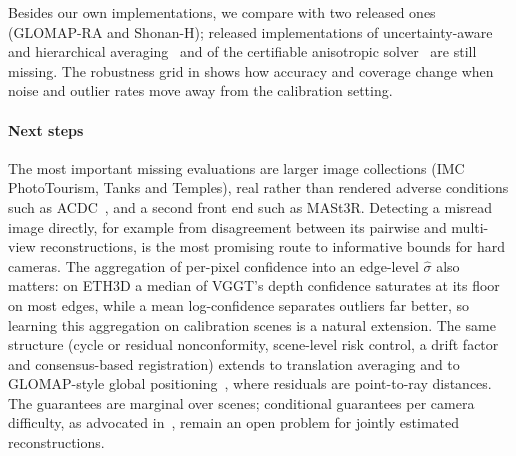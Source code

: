 Besides our own implementations, we compare with two released ones (GLOMAP-RA and Shonan-H); released implementations of uncertainty-aware and hierarchical averaging~\cite{zhang2023revisiting,lee2022hara} and of the certifiable anisotropic solver~\cite{olsson2025certifiably} are still missing. The robustness grid in  shows how accuracy and coverage change when noise and outlier rates move away from the calibration setting.

\paragraph*{Next steps} The most important missing evaluations are larger image collections (IMC PhotoTourism, Tanks and Temples), real rather than rendered adverse conditions such as ACDC~\cite{sakaridis2021acdc}, and a second front end such as MASt3R. Detecting a misread image directly, for example from disagreement between its pairwise and multi-view reconstructions, is the most promising route to informative bounds for hard cameras. The aggregation of per-pixel confidence into an edge-level $\hat\sigma$ also matters: on ETH3D a median of VGGT's depth confidence saturates at its floor on most edges, while a mean log-confidence separates outliers far better, so learning this aggregation on calibration scenes is a natural extension. The same structure (cycle or residual nonconformity, scene-level risk control, a drift factor and consensus-based registration) extends to translation averaging and to GLOMAP-style global positioning~\cite{pan2024glomap}, where residuals are point-to-ray distances. The guarantees are marginal over scenes; conditional guarantees per camera difficulty, as advocated in~\cite{pathak2026adaptive}, remain an open problem for jointly estimated reconstructions.
